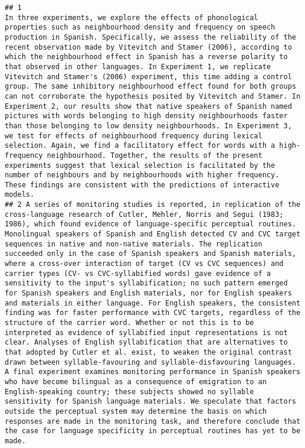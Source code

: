 \documentclass[cm]{glossa}
\begin{document}
\begin{verbatim}
## 1                                                                                                                                                                                                                                                                                                                                                                                                                               In three experiments, we explore the effects of phonological properties such as neighbourhood density and frequency on speech production in Spanish. Specifically, we assess the reliability of the recent observation made by Vitevitch and Stamer (2006), according to which the neighbourhood effect in Spanish has a reverse polarity to that observed in other languages. In Experiment 1, we replicate Vitevitch and Stamer's (2006) experiment, this time adding a control group. The same inhibitory neighbourhood effect found for both groups can not corroborate the hypothesis posited by Vitevitch and Stamer. In Experiment 2, our results show that native speakers of Spanish named pictures with words belonging to high density neighbourhoods faster than those belonging to low density neighbourhoods. In Experiment 3, we test for effects of neighbourhood frequency during lexical selection. Again, we find a facilitatory effect for words with a high-frequency neighbourhood. Together, the results of the present experiments suggest that lexical selection is facilitated by the number of neighbours and by neighbourhoods with higher frequency. These findings are consistent with the predictions of interactive models.
## 2 A series of monitoring studies is reported, in replication of the cross-language research of Cutler, Mehler, Norris and Segui (1983; 1986), which found evidence of language-specific perceptual routines. Monolingual speakers of Spanish and English detected CV and CVC target sequences in native and non-native materials. The replication succeeded only in the case of Spanish speakers and Spanish materials, where a cross-over interaction of target (CV vs CVC sequences) and carrier types (CV- vs CVC-syllabified words) gave evidence of a sensitivity to the input's syllabification; no such pattern emerged for Spanish speakers and English materials, nor for English speakers and materials in either language. For English speakers, the consistent finding was for faster performance with CVC targets, regardless of the structure of the carrier word. Whether or not this is to be interpreted as evidence of syllabified input representations is not clear. Analyses of English syllabification that are alternatives to that adopted by Cutler et al. exist, to weaken the original contrast drawn between syllable-favouring and syllable-disfavouring languages. A final experiment examines monitoring performance in Spanish speakers who have become bilingual as a consequence of emigration to an English-speaking country; these subjects showed no syllable sensitivity for Spanish language materials. We speculate that factors outside the perceptual system may determine the basis on which responses are made in the monitoring task, and therefore conclude that the case for language specificity in perceptual routines has yet to be made.

\end{verbatim}
\end{document}
